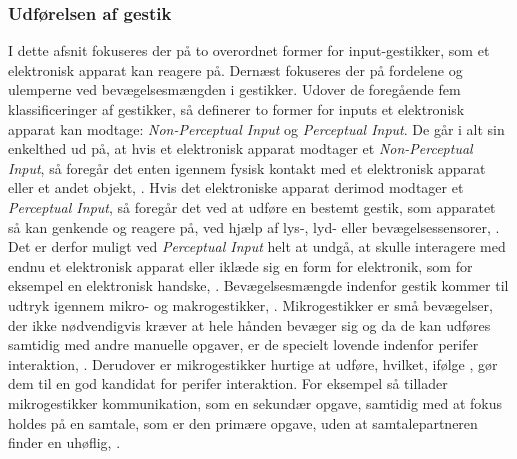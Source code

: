 \subsubsection{Udførelsen af gestik}
\label{UdfoerelseAfGestik}
%
I dette afsnit fokuseres der på to overordnet former for input-gestikker, som et elektronisk apparat kan reagere på. Dernæst fokuseres der på fordelene og ulemperne ved bevægelsesmængden i gestikker.\blankline
%
Udover de foregående fem klassificeringer af gestikker, så definerer \textcite[s. 9]{PDF:ATaxonomyOfGestures} to former for inputs et elektronisk apparat kan modtage: \textit{Non-Perceptual Input} og \textit{Perceptual Input}. De går i alt sin enkelthed ud på, at hvis et elektronisk apparat modtager et \textit{Non-Perceptual Input}, så foregår det enten igennem fysisk kontakt med et elektronisk apparat eller et andet objekt, \parencite[s. 10]{PDF:ATaxonomyOfGestures}. Hvis det elektroniske apparat derimod modtager et \textit{Perceptual Input}, så foregår det ved at udføre en bestemt gestik, som apparatet så kan genkende og reagere på, ved hjælp af lys-, lyd- eller bevægelsessensorer, \parencite[s. 12]{PDF:ATaxonomyOfGestures}. Det er derfor muligt ved \textit{Perceptual Input} helt at undgå, at skulle interagere med endnu et elektronisk apparat eller iklæde sig en form for elektronik, som for eksempel en elektronisk handske, \parencite[s. 12]{PDF:ATaxonomyOfGestures}.\blankline
%
Bevægelsesmængde indenfor gestik kommer til udtryk igennem mikro- og makrogestikker, \parencite[s. 6]{PDF:UsabilityofMicroVsMacroGestures}. Mikrogestikker er små bevægelser, der ikke nødvendigvis kræver at hele hånden bevæger sig og da de kan udføres samtidig med andre manuelle opgaver, er de specielt lovende indenfor perifer interaktion, \parencite[s. 95]{PDF:PeripheralInteraction}. Derudover er mikrogestikker hurtige at udføre, hvilket, ifølge \textcite[s. 96]{PDF:PeripheralInteraction}, gør dem til en god kandidat for perifer interaktion. For eksempel så tillader mikrogestikker kommunikation, som en sekundær opgave, samtidig med at fokus holdes på en samtale, som er den primære opgave, uden at samtalepartneren finder en uhøflig, \parencite[s. 97]{PDF:PeripheralInteraction}.

